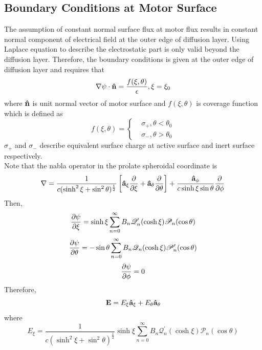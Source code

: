 \documentclass[fontsize=11pt, %
                             paper=a4, %
                             twoside, %
                             captions=tableheading,
                             index=totoc,
                             hyperref]{labbook}
\begin{document}
\subsection{Boundary Conditions at Motor Surface}
The assumption of constant normal surface flux at motor flux results in constant normal component of electrical field at the outer edge of diffusion layer. Using Laplace equation to describe the electrostatic part is only valid beyond the diffusion layer. Therefore, the boundary conditions is given at the outer edge of diffusion layer and requires that
\begin{equation}
\nabla\psi \cdot \mathbf{\hat{n}}= \frac{f(\xi,\theta)}{\epsilon},\xi=\xi_0
\end{equation}
where $\mathbf{\hat{n}}$ is unit normal vector of motor surface and $f(\xi,\theta)$ is coverage function which is defined as
\begin{equation}
f(\xi,\theta)=
\begin{cases}
&\sigma_+,\theta<\theta_0\\
&\sigma_-,\theta>\theta_0
\end{cases}
\end{equation}
$\sigma_+$ and $\sigma_-$ describe equivalent surface charge at active surface and inert surface respectively.\\
Note that the nabla operator in the prolate spheroidal coordinate is
\begin{equation}
\nabla=\frac{1}{c(\sinh^2\xi+\sin^2\theta)^{\frac{1}{2}}}\left[\mathbf{\hat{a}}_{\xi} \frac{\partial }{\partial \xi}+\mathbf{\hat{a}}_{\theta}\frac{\partial }{\partial \theta}\right]+\frac{\mathbf{\hat{a}}_{\phi}}{c\sinh\xi\sin\theta}\frac{\partial }{\partial \phi}
\end{equation}
Then,
\begin{equation}
\frac{\partial \psi}{\partial \xi}=\sinh\xi\sum_{n=0}^\infty B_n \mathscr{Q}_n^\prime(\cosh\xi)\mathscr{P}_n(\cos\theta)
\end{equation}
\begin{equation}
\frac{\partial \psi}{\partial \theta}=-\sin\theta\sum_{n=0}^\infty B_n\mathscr{Q}_n(\cosh\xi)\mathscr{P}_n^\prime(\cos\theta)
\end{equation}
\begin{equation}
\frac{\partial \psi}{\partial \phi}=0
\end{equation}
Therefore,
\begin{equation}
\mathbf{E}=E_\xi \mathbf{\hat{a}}_\xi+E_\theta\mathbf{\hat{a}}_\theta
\end{equation}
where
\begin{equation}
E_\xi=\frac{1}{c(\sinh^2\xi+\sin^2\theta)^{\frac{1}{2}}}\sinh\xi\sum_{n=0}^\infty B_n \mathscr{Q}_n^\prime(\cosh\xi)\mathscr{P}_n(\cos\theta)
\end{equation}
\end{document}
